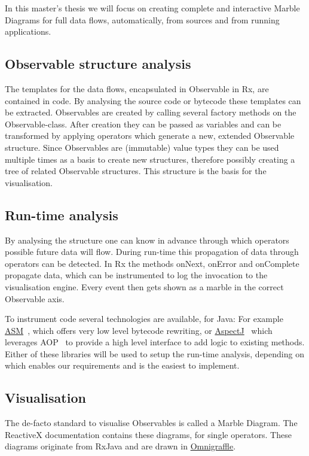\documentclass[11pt,a4paper]{article}
\begin{document}
In this master's thesis we will focus on creating complete and interactive Marble Diagrams for full data flows, automatically, from sources and from running applications.

\subsection{Observable structure analysis}
The templates for the data flows, encapsulated in Observable in Rx, are contained in code. By analysing the source code or bytecode these templates can be extracted. Observables are created by calling several factory methods on the Observable-class. After creation they can be passed as variables and can be transformed by applying operators which generate a new, extended Observable structure. Since Observables are (immutable) value types they can be used multiple times as a basis to create new structures, therefore possibly creating a tree of related Observable structures. This structure is the basis for the visualisation.

\subsection{Run-time analysis}
By analysing the structure one can know in advance through which operators possible future data will flow. During run-time this propagation of data through operators can be detected. In Rx the methods onNext, onError and onComplete propagate data, which can be instrumented to log the invocation to the visualisation engine. Every event then gets shown as a marble in the correct Observable axis.

To instrument code several technologies are available, for Java: 
For example \href{http://asm.ow2.org}{ASM}~\cite{bruneton2002asm, kuleshov2007using}, which offers very low level bytecode rewriting, 
or \href{http://www.eclipse.org/aspectj/}{AspectJ}~\cite{kiczales2001overview} which leverages AOP~\cite{kiczales1997aspect} to provide a high level interface to add logic to existing methods. Either of these libraries will be used to setup the run-time analysis, depending on which enables our requirements and is the easiest to implement.

\subsection{Visualisation}
The de-facto standard to visualise Observables is called a Marble Diagram. The ReactiveX documentation contains these diagrams, for single operators. These diagrams originate from RxJava and are drawn in \href{https://www.omnigroup.com/omnigraffle}{Omnigraffle}.
\end{document}
